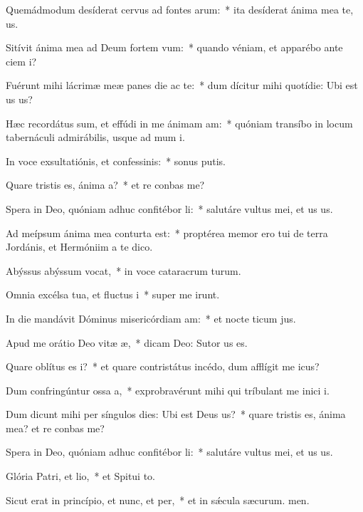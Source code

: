 \item Quemádmodum desíderat cervus ad fontes arum:~* ita desíderat ánima mea  te, us.
\item Sitívit ánima mea ad Deum fortem vum:~* quando véniam, et apparébo ante ciem i?
\item Fuérunt mihi lácrimæ meæ panes die ac te:~* dum dícitur mihi quotídie: Ubi est us us?
\item Hæc recordátus sum, et effúdi in me ánimam am:~* quóniam transíbo in locum tabernáculi admirábilis, usque ad mum i.
\item In voce exsultatiónis, et confessinis:~* sonus putis.
\item Quare tristis es, ánima a?~* et re conbas me?
\item Spera in Deo, quóniam adhuc confitébor li:~* salutáre vultus mei, et us us.
\item Ad meípsum ánima mea conturta est:~* proptérea memor ero tui de terra Jordánis, et Hermóniim a te dico.
\item Abýssus abýssum vocat,~* in voce cataracrum turum.
\item Omnia excélsa tua, et fluctus i~* super me irunt.
\item In die mandávit Dóminus misericórdiam am:~* et nocte ticum jus.
\item Apud me orátio Deo vitæ æ,~* dicam Deo: Sutor us es.
\item Quare oblítus es i?~* et quare contristátus incédo, dum afflígit me icus?
\item Dum confringúntur ossa a,~* exprobravérunt mihi qui tríbulant me inici i.
\item Dum dicunt mihi per síngulos dies: Ubi est Deus us?~* quare tristis es, ánima mea? et re conbas me?
\item Spera in Deo, quóniam adhuc confitébor li:~* salutáre vultus mei, et us us.
\item Glória Patri, et lio,~* et Spitui to.
\item Sicut erat in princípio, et nunc, et per,~* et in sǽcula sæcurum. men.
